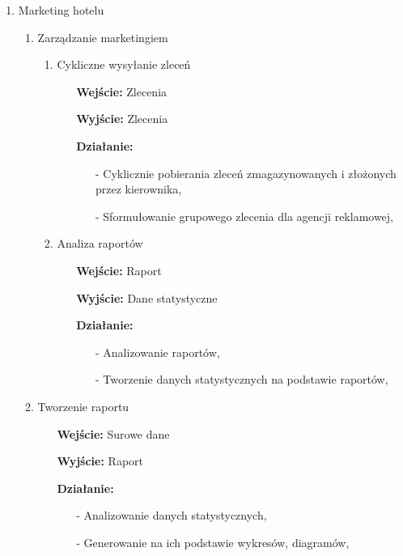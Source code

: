 \documentclass[a4paper, 11pt]{article}
\begin{document}
\begin{enumerate}[label*=\arabic*.]
\begin{enumerate}[label*=\arabic*.]
\begin{enumerate}[label*=\arabic*.]
			\end{enumerate}						
		\end{enumerate}
		\item Marketing hotelu
		\begin{enumerate}[label*=\arabic*.]
			\item Zarządzanie marketingiem
			\begin{enumerate}[label*=\arabic*.]
				\item Cykliczne wysyłanie zleceń
				\begin{itemize}
					\item [\textbf{Wejście:}] Zlecenia
					\item [\textbf{Wyjście:}] Zlecenia
					\item [\textbf{Działanie:}] 
					\begin{itemize}
						\item[-] Cyklicznie pobierania zleceń zmagazynowanych i złożonych przez kierownika,
						\item[-] Sformułowanie grupowego zlecenia dla agencji reklamowej,
					\end{itemize}
				\end{itemize}
				\item Analiza raportów
				\begin{itemize}
					\item [\textbf{Wejście:}] Raport
					\item [\textbf{Wyjście:}] Dane statystyczne
					\item [\textbf{Działanie:}] 
					\begin{itemize}
						\item[-] Analizowanie raportów,
						\item[-] Tworzenie danych statystycznych na podstawie raportów,
					\end{itemize}
				\end{itemize}
			\end{enumerate}	
			\item Tworzenie raportu
			\begin{itemize}
				\item [\textbf{Wejście:}] Surowe dane
				\item [\textbf{Wyjście:}] Raport
				\item [\textbf{Działanie:}] 
				\begin{itemize}
					\item[-] Analizowanie danych statystycznych,
					\item[-] Generowanie na ich podstawie wykresów, diagramów,

\end{itemize}
\end{itemize}
\end{enumerate}
\end{enumerate}
\end{document}
